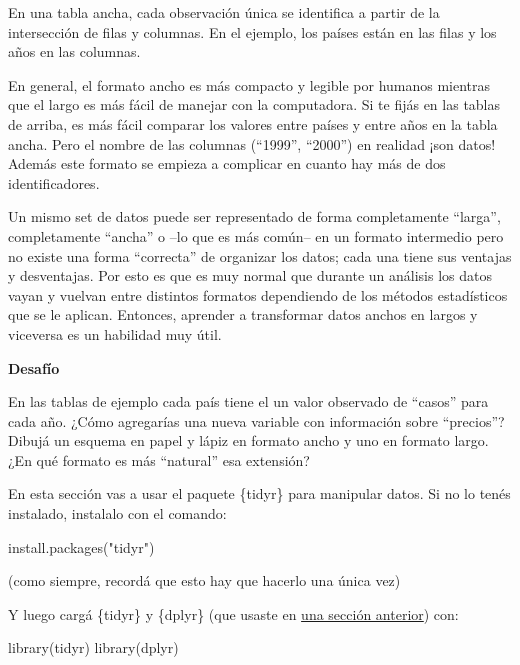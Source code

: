 \documentclass[
  openany]{book}
\newenvironment{Shaded}{\begin{snugshade}}{\end{snugshade}}
\newcommand{\FunctionTok}[1]{\textcolor[rgb]{0.00,0.00,0.00}{#1}}
\newcommand{\NormalTok}[1]{#1}
\newcommand{\StringTok}[1]{\textcolor[rgb]{0.31,0.60,0.02}{#1}}
\begin{document}
En una tabla ancha, cada observación única se identifica a partir de la intersección de filas y columnas.
En el ejemplo, los países están en las filas y los años en las columnas.

En general, el formato ancho es más compacto y legible por humanos mientras que el largo es más fácil de manejar con la computadora.
Si te fijás en las tablas de arriba, es más fácil comparar los valores entre países y entre años en la tabla ancha.
Pero el nombre de las columnas (``1999'', ``2000'') en realidad ¡son datos!
Además este formato se empieza a complicar en cuanto hay más de dos identificadores.

Un mismo set de datos puede ser representado de forma completamente ``larga'', completamente ``ancha'' o --lo que es más común-- en un formato intermedio pero no existe una forma ``correcta'' de organizar los datos; cada una tiene sus ventajas y desventajas.
Por esto es que es muy normal que durante un análisis los datos vayan y vuelvan entre distintos formatos dependiendo de los métodos estadísticos que se le aplican.
Entonces, aprender a transformar datos anchos en largos y viceversa es un habilidad muy útil.

\textbf{Desafío}

En las tablas de ejemplo cada país tiene el un valor observado de ``casos'' para cada año.
¿Cómo agregarías una nueva variable con información sobre ``precios''?
Dibujá un esquema en papel y lápiz en formato ancho y uno en formato largo.
¿En qué formato es más ``natural'' esa extensión?

En esta sección vas a usar el paquete \{tidyr\} para manipular datos.
Si no lo tenés instalado, instalalo con el comando:

\begin{Shaded}
\begin{Highlighting}[]
\FunctionTok{install.packages}\NormalTok{(}\StringTok{"tidyr"}\NormalTok{)}
\end{Highlighting}
\end{Shaded}

(como siempre, recordá que esto hay que hacerlo una única vez)

Y luego cargá \{tidyr\} y \{dplyr\} (que usaste en \href{05-dplyr-I.html}{una sección anterior}) con:

\begin{Shaded}
\begin{Highlighting}[]
\FunctionTok{library}\NormalTok{(tidyr)}
\FunctionTok{library}\NormalTok{(dplyr)}
\end{Highlighting}
\end{Shaded}
\end{document}
